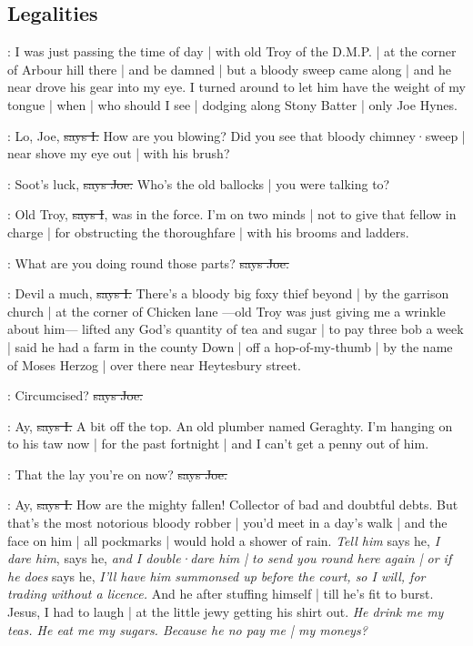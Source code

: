 \subsection*{Legalities}

\Nq:
I was just passing the time of day |
with old Troy of the D.M.P. |
at the corner of Arbour hill there |
and be damned |
but a bloody sweep came along |
and he near drove his gear into my eye.
I turned around
to let him have the weight of my tongue |
when |
who should I see |
dodging along Stony Batter |
only Joe Hynes.

:
Lo,
Joe,
\sout{says I.}
How are you blowing?
Did you see that bloody chimney·sweep |
near shove my eye out |
with his brush?

\joe:
Soot's luck,
\sout{says Joe.}
Who's the old ballocks |
you were talking to?

:
Old Troy,
\sout{says I},
was in the force.
I'm on two minds |
not to give that fellow in charge |
for obstructing the thoroughfare
 |
with his brooms and ladders.

\joe:
What are you doing round those parts?
\sout{says Joe.}

:
Devil a much,
\sout{says I.}
There's a bloody big foxy thief beyond |
by the garrison church |
at the corner of Chicken lane%
—old Troy was just giving me a wrinkle about him—%
lifted any God's quantity of tea and sugar |
to pay three bob a week |
said he had a farm in the county Down |
off a hop-of-my-thumb |
by the name of Moses Herzog |
over there near Heytesbury street.

\joe:
Circumcised?
\sout{says Joe.}

:
Ay,
\sout{says I.}
A bit off the top.
An old plumber named Geraghty.
I'm hanging on to his taw now |
for the past fortnight |
and I can't get a penny out of him.

\joe:
That the lay you're on now?
\sout{says Joe.}

:
Ay,
\sout{says I.}
How are the mighty fallen!
Collector of bad and doubtful debts.
But that's the most notorious bloody robber |
you'd meet in a day's walk |
and the face on him |
all pockmarks |
would hold a shower of rain.
\emph{Tell him}
says he,
\emph{I dare him},
says he,
\emph{and I double·dare him |
to send you round here again |
or if he does}
says he,
\emph{I'll have him summonsed up before the court,
so I will,
for trading without a licence.}
And he after stuffing himself |
till he's fit to burst.
Jesus,
I had to laugh |
at the little jewy getting his shirt out.
\emph{He drink me my teas.
He eat me my sugars.
Because he no pay me |
my moneys?}

